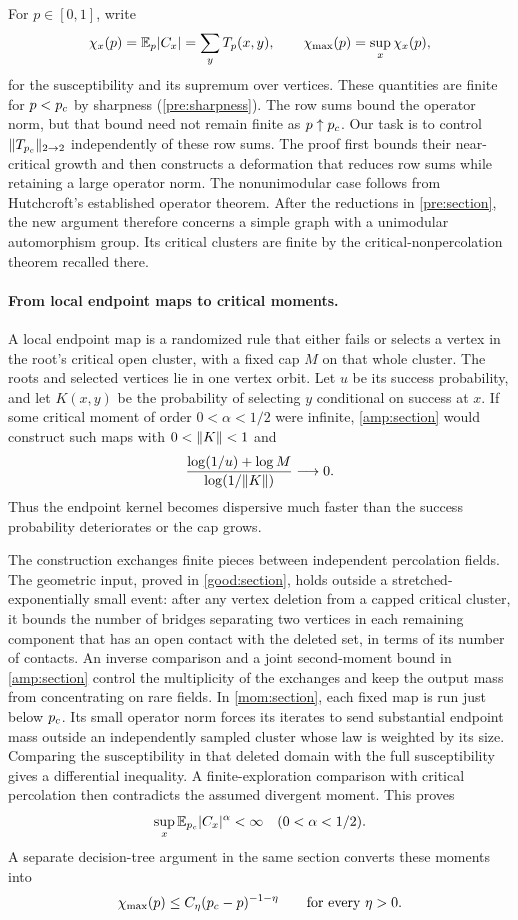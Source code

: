 For $p\in[0,1]$, write
\[
 \chi_x(p)=\mathbb E_p|C_x|=\sum_yT_p(x,y),\qquad
 \chi_{\max}(p)=\sup_x\chi_x(p),
\]
for the susceptibility and its supremum over vertices. These quantities
are finite for $p<{p_c}$ by sharpness (\cref{pre:sharpness}). The row sums
bound the operator norm, but that bound need not remain finite as
$p\uparrow{p_c}$. Our task is to control
$\lVert T_{p_c}\rVert_{2\to2}$ independently of these row sums. The proof first
bounds their near-critical growth and then constructs a deformation
that reduces row sums while retaining a large operator norm.
The nonunimodular case follows from Hutchcroft's established operator
theorem. After the reductions in \cref{pre:section}, the new argument
therefore concerns a simple graph with a unimodular automorphism group.
Its critical clusters are finite by the critical-nonpercolation theorem
recalled there.

\paragraph{From local endpoint maps to critical moments.}
A local endpoint map is a randomized rule that either fails or selects
a vertex in the root's critical open cluster, with a fixed cap $M$ on
that whole cluster. The roots and selected vertices lie in one vertex
orbit. Let $u$ be its success probability, and let $K(x,y)$ be the
probability of selecting $y$ conditional on success at $x$.
If some critical moment of order
$0<\alpha<1/2$ were infinite, \cref{amp:section} would construct such
maps with $0<\lVert K\rVert<1$ and
\[
 \frac{\log(1/u)+\log M}{\log(1/\lVert K\rVert)}\longrightarrow0.
\]
Thus the endpoint kernel becomes dispersive much faster than the success
probability deteriorates or the cap grows.

The construction exchanges finite pieces between independent
percolation fields. The geometric input, proved in \cref{good:section},
holds outside a stretched-exponentially small event: after any vertex
deletion from a capped critical cluster, it bounds the number of bridges
separating two vertices in each remaining component that has an open
contact with the deleted set, in terms of its number of contacts.
An inverse comparison and a
joint second-moment bound in \cref{amp:section} control the multiplicity
of the exchanges and keep the output mass from concentrating on rare
fields. In \cref{mom:section}, each fixed map is run just below ${p_c}$.
Its small operator norm forces its iterates to send substantial endpoint
mass outside an independently sampled cluster whose law is weighted
by its size. Comparing the susceptibility in that deleted
domain with the full susceptibility gives a differential inequality.
A finite-exploration comparison with critical percolation then
contradicts the assumed divergent moment. This proves
\[
 \sup_x\mathbb E_{p_c}|C_x|^\alpha<\infty\quad(0<\alpha<1/2).
\]
A separate decision-tree argument in the same section converts these
moments into
\[
 \chi_{\max}(p)\le C_\eta({p_c}-p)^{-1-\eta}
 \qquad\text{for every }\eta>0.
\]

